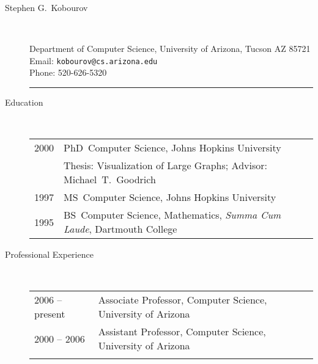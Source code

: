 \documentclass[10pt]{article}
\begin{document}
\vspace{-.1cm}
\begin{description}

\item [\Large Stephen G.~Kobourov]\
\smallskip


Department of Computer Science, University of Arizona, Tucson AZ 85721\\
Email: {\tt kobourov@cs.arizona.edu}\\
Phone: 520-626-5320\\\vspace{-.1cm}
\hrule
\smallskip

\item [Education]\


\begin{tabular}{lp{4.9in}}

\hspace{-.2cm}2000 &  PhD~Computer Science, { Johns Hopkins University}
\\\vspace{.1cm}&Thesis: Visualization of Large Graphs; Advisor: Michael~T.~Goodrich\\

\vspace{.1cm}\hspace{-.2cm}1997 &  MS~Computer Science, { Johns Hopkins University} \\

\hspace{-.2cm}1995 & BS~Computer Science, Mathematics, %
{\em Summa Cum Laude}, { Dartmouth College}
\end{tabular}


\item [Professional Experience]\


\begin{tabular}{lp{4.9in}}
\vspace{.1cm}
\hspace{-.2cm}2006 -- present & Associate Professor, Computer Science,
{University of Arizona}\\\vspace{.1cm}

\hspace{-.2cm}2000 -- 2006 & Assistant Professor, Computer Science, {University of Arizona}\\\vspace{.1cm}


\end{tabular}
\end{description}
\end{document}
